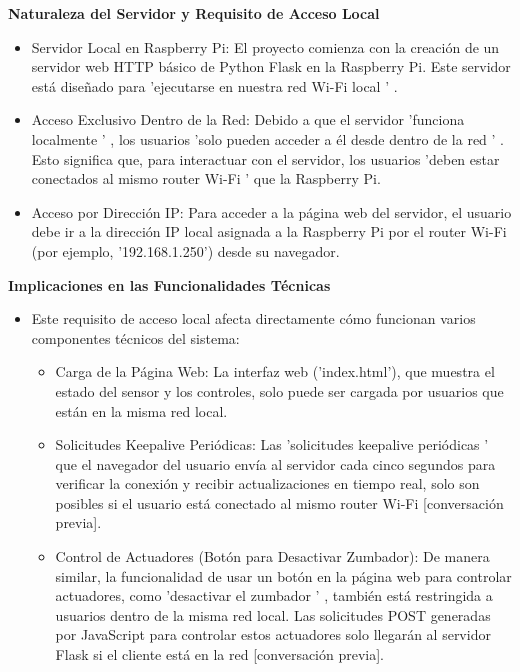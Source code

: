 \documentclass{report}
\begin{document}
\textbf{Naturaleza del Servidor y Requisito de Acceso Local}
\begin{itemize}
    \item Servidor Local en Raspberry Pi:  El proyecto comienza con la creación de un servidor web HTTP básico de Python Flask en la Raspberry Pi. 
    Este servidor está diseñado para   'ejecutarse en nuestra red Wi-Fi local ' .
    \item Acceso Exclusivo Dentro de la Red:  Debido a que el servidor   'funciona localmente ' , los usuarios   'solo pueden acceder a él desde dentro 
    de la red ' . Esto significa que, para interactuar con el servidor, los usuarios   'deben estar conectados al mismo router Wi-Fi '  que la Raspberry Pi.
    \item Acceso por Dirección IP:  Para acceder a la página web del servidor, el usuario debe ir a la dirección IP local asignada a la Raspberry Pi por 
    el router Wi-Fi (por ejemplo, '192.168.1.250') desde su navegador.
\end{itemize}

\textbf{Implicaciones en las Funcionalidades Técnicas}
\begin{itemize}
\item Este requisito de acceso local afecta directamente cómo funcionan varios componentes técnicos del sistema:
    \begin{itemize}
        \item Carga de la Página Web:  La interfaz web ('index.html'), que muestra el estado del sensor y los controles, solo puede ser cargada por 
        usuarios que están en la misma red local.
        \item Solicitudes Keepalive Periódicas:  Las   'solicitudes keepalive periódicas '  que el navegador del usuario envía al servidor cada cinco 
        segundos para verificar la conexión y recibir actualizaciones en tiempo real, solo son posibles si el usuario está conectado al mismo router 
        Wi-Fi [conversación previa].
        \item Control de Actuadores (Botón para Desactivar Zumbador):  De manera similar, la funcionalidad de usar un botón en la página web para 
        controlar actuadores, como   'desactivar el zumbador ' , también está restringida a usuarios dentro de la misma red local. Las solicitudes 
        POST generadas por JavaScript para controlar estos actuadores solo llegarán al servidor Flask si el cliente está en la red [conversación previa].
    \end{itemize}
\end{itemize}
\end{document}

